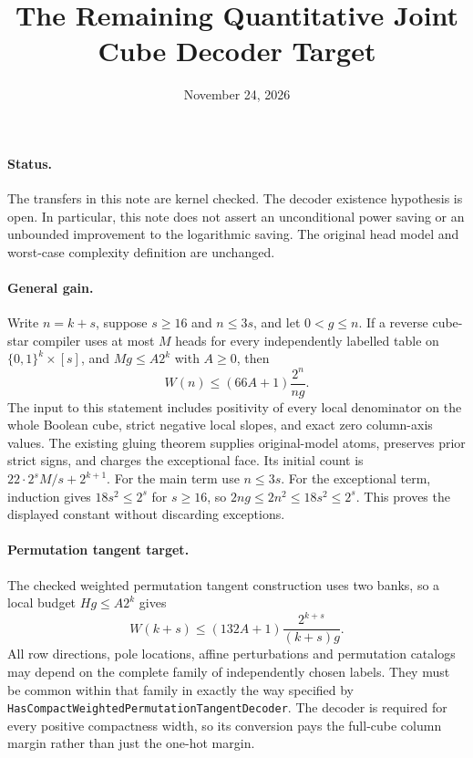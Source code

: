 \documentclass[11pt]{article}
\begin{document}
\title{The Remaining Quantitative Joint Cube Decoder Target}
\author{}
\date{November 24, 2026}
\maketitle

\paragraph{Status.}
The transfers in this note are kernel checked. The decoder existence
hypothesis is open. In particular, this note does not assert an unconditional
power saving or an unbounded improvement to the logarithmic saving.
The original head model and worst-case complexity definition are unchanged.

\paragraph{General gain.}
Write $n=k+s$, suppose $s\geq16$ and $n\leq3s$, and let $0<g\leq n$.
If a reverse cube-star compiler uses at most $M$ heads for every independently
labelled table on $\{0,1\}^k\times[s]$, and
$Mg\leq A2^k$ with $A\geq0$, then
\[
 W(n)\leq(66A+1)\frac{2^n}{ng}.
\]
The input to this statement includes positivity of every local denominator
on the whole Boolean cube, strict negative local slopes, and exact zero
column-axis values. The existing gluing theorem supplies original-model
atoms, preserves prior strict signs, and charges the exceptional face.
Its initial count is $22\cdot2^sM/s+2^{k+1}$.
For the main term use $n\leq3s$.
For the exceptional term, induction gives $18s^2\leq2^s$ for $s\geq16$,
so $2ng\leq2n^2\leq18s^2\leq2^s$.
This proves the displayed constant without discarding exceptions.

\paragraph{Permutation tangent target.}
The checked weighted permutation tangent construction uses two banks,
so a local budget $Hg\leq A2^k$ gives
\[
 W(k+s)\leq(132A+1)\frac{2^{k+s}}{(k+s)g}.
\]
All row directions, pole locations, affine perturbations and permutation
catalogs may depend on the complete family of independently chosen labels.
They must be common within that family in exactly the way specified by
\texttt{HasCompactWeightedPermutationTangentDecoder}. The decoder is required
for every positive compactness width, so its conversion pays the full-cube
column margin rather than just the one-hot margin.
\end{document}
